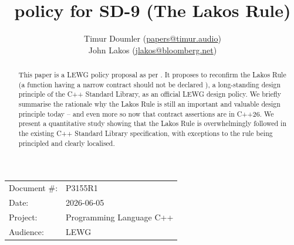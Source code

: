

 \usepackage[bottom]{footmisc} 
 
 \setcounter{section}{-1}
 
\usepackage{pgf-pie}  
 


\usepackage{titlesec}
\usepackage{tocloft}
 

\newcommand{\changelocaltocdepth}[1]{%
  \addtocontents{toc}{\protect\setcounter{tocdepth}{#1}}%
  \setcounter{tocdepth}{#1}%
}

\setcounter{tocdepth}{4}



\title{ policy for SD-9 (The Lakos Rule)}
\author{ Timur Doumler \small(\href{mailto:papers@timur.audio}{papers@timur.audio})  \\
John Lakos \small(\href{mailto:jlakos@bloomberg.net}{jlakos@bloomberg.net})
}
\date{}
\maketitle

\begin{tabular}{ll}
Document \#: & P3155R1 \\
Date: &2026-06-05 \\
Project: & Programming Language C++ \\
Audience: & LEWG
\end{tabular}


\begin{abstract}
This paper is a LEWG policy proposal as per \cite{SD-9}. It proposes to reconfirm the Lakos Rule (a function having a narrow contract should not be declared ), a long-standing design principle of the C++ Standard Library, as an official LEWG design policy. We briefly summarise the rationale why the Lakos Rule is still an important and valuable design principle today -- and even more so now that contract assertions are in C++26. We present a quantitative study showing that the Lakos Rule is overwhelmingly followed in the existing C++ Standard Library specification, with exceptions to the rule being principled and clearly localised.
\end{abstract}


